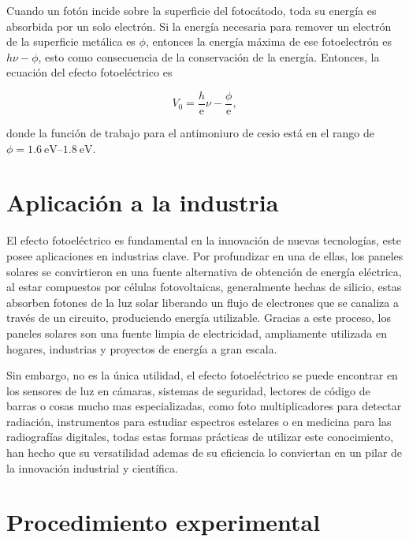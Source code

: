 \documentclass[12pt]{IEEEtran}
\begin{document}
Cuando un fotón incide sobre la superficie del fotocátodo, toda su energía es absorbida por un solo electrón. Si la energía necesaria para remover un electrón de la superficie metálica es \(\phi\), entonces la energía máxima de ese fotoelectrón es \(h\nu - \phi\), esto como consecuencia de la conservación de la energía. Entonces, la ecuación del efecto fotoeléctrico es

\begin{equation}
    V_{0} = \dfrac{h}{\mathrm{e}}\nu - \dfrac{\phi}{\mathrm{e}},
    \label{eq:photoelectric}
\end{equation}

donde la función de trabajo para el antimoniuro de cesio está en el rango de \(\phi = \qtyrange[range-phrase=\text{--}]{1.6}{1.8}{\eV}\)\cite{sakataStudiesCs3SbPhotoCathode1953,caulfieldCesiumAntimonyFilms1966}.

\section{Aplicación a la industria}

El efecto fotoeléctrico es fundamental en la innovación de nuevas tecnologías, este posee aplicaciones en industrias clave. Por profundizar en una de ellas, los paneles solares \cite{panelessolaresfotovoltanicos} se convirtieron en una fuente alternativa de obtención de energía eléctrica, al estar compuestos por células fotovoltaicas, generalmente hechas de silicio, estas absorben fotones de la luz solar liberando un flujo de electrones que se canaliza a través de un circuito, produciendo energía utilizable. Gracias a este proceso, los paneles solares son una fuente limpia de electricidad, ampliamente utilizada en hogares, industrias y proyectos de energía a gran escala.

Sin embargo, no es la única utilidad, el efecto fotoeléctrico se puede encontrar en los sensores de luz en cámaras, sistemas de seguridad, lectores de código de barras o cosas mucho mas especializadas, como foto multiplicadores para detectar radiación, instrumentos para estudiar espectros estelares o en medicina para las radiografías digitales, todas estas formas prácticas de utilizar este conocimiento, han hecho que su versatilidad ademas de su eficiencia lo conviertan en un pilar de la innovación industrial y científica.

\section{Procedimiento experimental}
\end{document}
